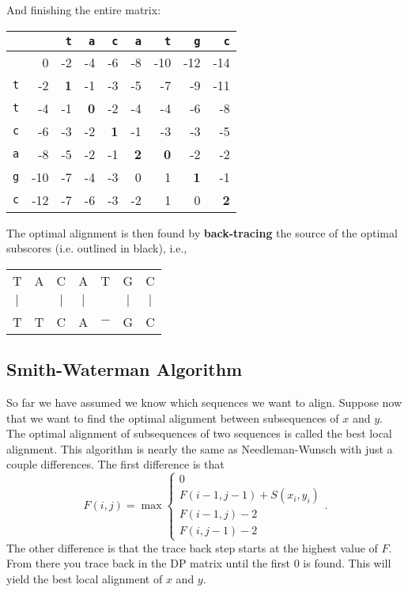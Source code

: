 \documentclass{article}
\numberwithin{equation}{section}
\begin{document}
And finishing the entire matrix:

\begin{center}
\begin{tabular}{|c|rrrrrrrr|}\hline
              &      &{\tt t}    &{\tt a}      &{\tt c} &{\tt a}     &{\tt t}     &{\tt g} &{\tt c}\\ \hline%
               & 0   & -2        &-4          & -6         &-8          & -10  & -12 & -14\\
 \texttt{t} & -2  & {\bf 1} & -1 & -3 & -5 & -7 & -9 & -11\\
 \texttt{t} & -4  & -1 & {\bf 0} & -2 & -4 & -4 & -6 & -8 \\
 \texttt{c} & -6  & -3 & -2 & {\bf 1} & -1 & -3 & -3 & -5\\
 \texttt{a} & -8  & -5 & -2 & -1 & {\bf 2} & {\bf 0} & -2 & -2 \\
 \texttt{g} & -10 & -7 & -4 & -3 & 0 & 1 & {\bf 1} & -1 \\
 \texttt{c} & -12 & -7 & -6 & -3 & -2 & 1 & 0 & {\bf 2}  \\\hline
 \end{tabular}
\end{center}

The optimal alignment is then found by {\bf back-tracing} the source of the optimal subscores (i.e. outlined in black), i.e.,

\begin{center}
\begin{tabular}{ccccccc}
T & A & C &  A &  T &  G & C \\
$\mid$ &  & $\mid$ & $\mid$ & & $\mid$ & $\mid$\\
T & T & C & A & $-$ & G & C \\
\end{tabular}
\end{center}


\subsection{Smith-Waterman Algorithm}

So far we have assumed we know which sequences we want to align.
Suppose now that we want to find the optimal alignment between
subsequences of $x$ and $y$. The optimal alignment of subsequences
of two sequences is called the best local alignment.  This algorithm
is nearly the same as Needleman-Wunsch with just a couple
differences.  The first difference is that
\[
F(i,j)=\max\left\{
\begin{array}{l}
0 \\
F(i-1,j-1)+S(x_i,y_i) \\
F(i-1,j)-2 \\
F(i,j-1)-2
\end{array}
\right. .
\]
The other difference is that the trace back step starts at the
highest value of $F$.  From there you trace back in the DP matrix
until the first 0 is found.  This will yield the best local
alignment of $x$ and $y$.
\end{document}
